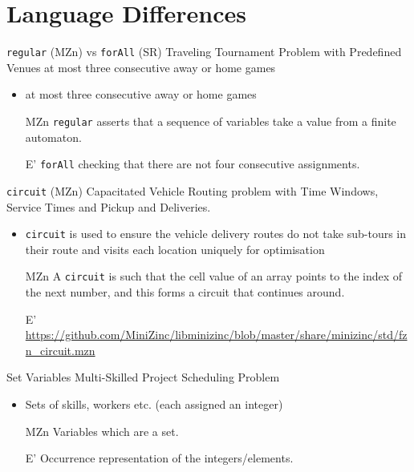 \documentclass{beamer}
\begin{document}
\section*{Language Differences}
\begin{frame}{\texttt{regular} (MZn) vs \texttt{forAll} (SR)}
Traveling Tournament Problem with Predefined Venues at most three consecutive away or home games
\begin{itemize}
    \item at most three consecutive away or home games
    \item[MZn] \texttt{regular} asserts that a sequence of variables take a value from a finite automaton.
    \item[E'] \texttt{forAll} checking that there are not four consecutive assignments.
\end{itemize}
\end{frame}

\begin{frame}{\texttt{circuit} (MZn)}
Capacitated Vehicle Routing problem with Time Windows, Service Times and Pickup and Deliveries.
\begin{itemize}
    \item \texttt{circuit} is used to ensure the vehicle delivery routes do not take sub-tours in their route and visits each location uniquely for optimisation
    \item[MZn] A \texttt{circuit} is such that the cell value of an array points to the index of the next number, and this forms a circuit that continues around. 
    \item[E'] \url{https://github.com/MiniZinc/libminizinc/blob/master/share/minizinc/std/fzn_circuit.mzn}
\end{itemize}
\end{frame}


\begin{frame}{Set Variables}
    Multi-Skilled Project Scheduling Problem
    \begin{itemize}
        \item Sets of skills, workers etc. (each assigned an integer)
        \item[MZn] Variables which are a set.
        \item[E'] Occurrence representation of the integers/elements.
    \end{itemize} 
\end{frame}
\end{document}
